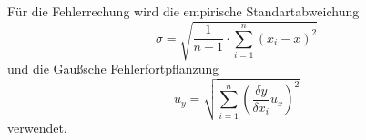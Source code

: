 Für die Fehlerrechung wird die empirische Standartabweichung
\begin{equation}
  \sigma = \sqrt{\frac{1}{n-1} \cdot \sum_{i=1}^n(x_i-\overline{x})^2}
  \label{eqn:Stdabweichung}
\end{equation}
und die Gaußsche Fehlerfortpflanzung
\begin{equation}
  u_y = \sqrt{\sum_{i=1}^n\left(\frac{\delta y}{\delta x_i}u_x\right)^2}
  \label{eqn:gauß}
\end{equation}
verwendet.
